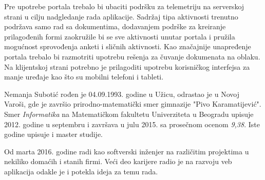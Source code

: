 \documentclass[12pt,oneside]{memoir}
\begin{document}
Pre upotrebe portala trebalo bi ubaciti podršku za telemetriju na serverskoj strani
u cilju nadgledanje rada aplikacije. 
Sadržaj tipa aktivnosti trenutno podržava samo rad sa dokumentima, dodavanjem podrške za
kreiranje prilagođenih formi zaokružile bi se sve aktivnosti unutar portala i pružila
mogućnost sprovođenja anketi i sličnih aktivnosti.
Kao značajnije unapređenje portala trebalo bi razmotriti
upotrebu rešenja za čuvanje dokumenata na oblaku. Na klijentskoj strani potrebno je
prilagoditi upotrebu korisničkog interfejsa za manje uređaje kao što su mobilni telefoni i tableti.

\literatura


\backmatter

\begin{biografija}
Nemanja Subotić rođen je 04.09.1993. godine u Užicu, odrastao je u Novoj Varoši,
gde je završio prirodno-matematički smer gimnazije "Pivo Karamatijević".
Smer \emph{Informatika} na Matematičkom fakultetu Univerziteta u Beogradu upisuje
2012. godine u septembru i završava u julu 2015. sa prosečnom ocenom \emph{9,38}.
Iste godine upisuje i master studije.

Od marta 2016. godine radi kao softverski inženjer na različitim projektima u
nekiliko domaćih i stanih firmi. Veći deo karijere radio je na razvoju veb
aplikacija odakle je i potekla ideja za temu rada.
\end{biografija}
\end{document}
